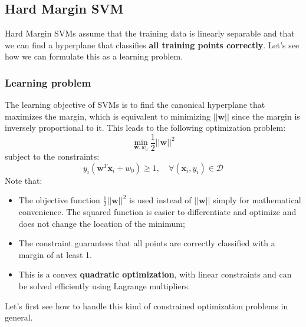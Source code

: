 \subsection{Hard Margin SVM}
Hard Margin SVMs assume that the training data is linearly separable and that we can find a hyperplane that classifies 
\textbf{all training points correctly}. Let's see how we can formulate this as a learning problem.

\subsubsection{Learning problem}
The learning objective of SVMs is to find the canonical hyperplane that maximizes the margin, 
which is equivalent to minimizing $||\boldsymbol{w}||$ since the margin is inversely proportional to it.
This leads to the following optimization problem:
\begin{equation}\label{eq:svm_opt}
    \min_{\boldsymbol{w}, w_0} \frac{1}{2} ||\boldsymbol{w}||^2
\end{equation}
subject to the constraints:
\[
    y_i (\boldsymbol{w}^T \boldsymbol{x}_i + w_0) \geq 1, \quad \forall (\boldsymbol{x}_i, y_i) \in \mathcal{D}
\]
Note that:
\begin{itemize}
    \item The objective function $\frac{1}{2} ||\boldsymbol{w}||^2$ is used 
    instead of $||\boldsymbol{w}||$ simply for mathematical convenience. 
    The squared function is easier to differentiate and optimize and does not change the location of the minimum;
    \item The constraint guarantees that all points are correctly classified with a margin of at least 1.
    \item This is a convex \textbf{quadratic optimization}, with linear constraints and can be solved 
    efficiently using Lagrange multipliers.
\end{itemize}

Let's first see how to handle this kind of constrained optimization problems in general.
